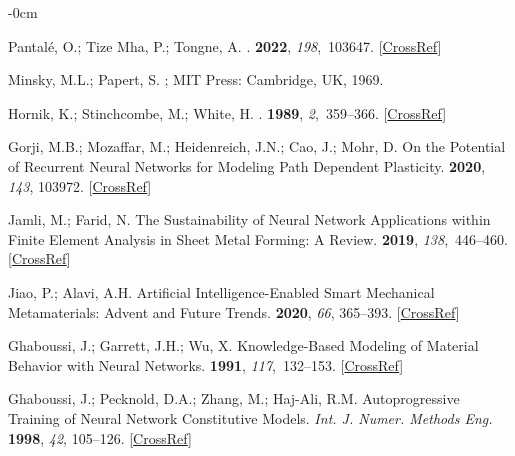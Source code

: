 \documentclass[algorithms,article,accept,pdftex,oneauthors]{Definitions/mdpi}
\begin{document}
\begin{adjustwidth}{-\extralength}{0cm}
\begin{thebibliography}{999}
Pantal{\'e}, O.; {Tize Mha}, P.; Tongne, A.
.
 {\bf 2022}, {\em
198},~103647. [\href{http://dx.doi.org/10.1016/j.finel.2021.103647}{CrossRef}]

Minsky, M.L.; Papert, S.
;
{MIT Press:} Cambridge, UK, 
1969.

Hornik, K.; Stinchcombe, M.; White, H.
.
 {\bf 1989}, {\em 2},~359--366. [\href{http://dx.doi.org/10.1016/0893-6080(89)90020-8}{CrossRef}]

Gorji, M.B.; Mozaffar, M.; Heidenreich, J.N.; Cao, J.; Mohr, D.
\newblock On the Potential of Recurrent Neural Networks for Modeling Path
Dependent Plasticity.
 {\bf 2020}, {\em
143}, 103972. [\href{http://dx.doi.org/10.1016/j.jmps.2020.103972}{CrossRef}]

Jamli, M.; Farid, N.
\newblock The Sustainability of Neural Network Applications within Finite
Element Analysis in Sheet Metal Forming: {{A}} Review.
 {\bf 2019}, {\em 138},~446--460. [\href{http://dx.doi.org/10.1016/j.measurement.2019.02.034}{CrossRef}]

Jiao, P.; Alavi, A.H.
\newblock Artificial Intelligence-Enabled Smart Mechanical Metamaterials:
Advent and Future Trends.
 {\bf 2020}, \emph{66}, 365--393. [\href{http://dx.doi.org/10.1080/09506608.2020.1815394}{CrossRef}]

Ghaboussi, J.; Garrett, J.H.; Wu, X.
\newblock Knowledge-{{Based Modeling}} of {{Material Behavior}} with {{Neural
Networks}}.
 {\bf 1991}, {\em
117},~132--153. [\href{http://dx.doi.org/10.1061/(ASCE)0733-9399(1991)117:1(132)}{CrossRef}]

Ghaboussi, J.; Pecknold, D.A.; Zhang, M.; {Haj-Ali}, R.M.
\newblock Autoprogressive Training of Neural Network Constitutive Models. \emph{ Int. J. Numer. Methods Eng.} \textbf{1998}, \emph{42}, 105--126. [\href{http://dx.doi.org/10.1002/(SICI)1097-0207(19980515)42:1<105::AID-NME356>3.0.CO;2-V}{CrossRef}]


\end{thebibliography}
\end{adjustwidth}
\end{document}
